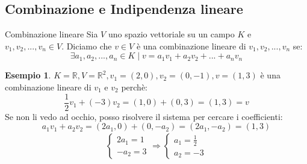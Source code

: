 \documentclass[a4paper]{article}
\theoremstyle{definition}
\newtheorem*{dimm}{Dimostrazione}
\newtheorem*{es}{Esempio}
\newtheorem*{prop}{Proposizione}
\begin{document}

\subsection{Combinazione e Indipendenza lineare}

\begin{deff}{Combinazione lineare}{}
	Sia $V$ uno spazio vettoriale su un campo $K$ e $v_1, v_2, ..., v_n \in V$.
	Diciamo che $v \in V$ è una combinazione lineare di $v_1, v_2, ..., v_n$ se:
	\[ \exists a_1, a_2, ..., a_n \in K \mid v = a_1v_1 + a_2v_2 + ... + a_nv_n \]
\end{deff}
\begin{es}
	$K = \mathbb{R}, V = \mathbb{R}^2, v_1 = (2, 0), v_2 = (0, -1), v = (1, 3)$ è una combinazione lineare di $v_1$ e $v_2$ perchè:
	\[ \frac{1}{2}v_1 + (-3)v_2 = (1, 0) + (0, 3) = (1, 3) = v \]
	Se non li vedo ad occhio, posso risolvere il sistema per cercare i coefficienti:
	\[ a_1v_1 + a_2v_2 = (2a_1, 0) + (0, -a_2) = (2a_1, -a_2) = (1, 3) \]
	\begin{align*}
		\begin{cases}
			2a_1 = 1 \\
			-a_2 = 3
		\end{cases}
		\Rightarrow
		\begin{cases}
			a_1 = \frac{1}{2} \\
			a_2 = -3
		\end{cases}
	\end{align*}
\end{es}
\end{document}

